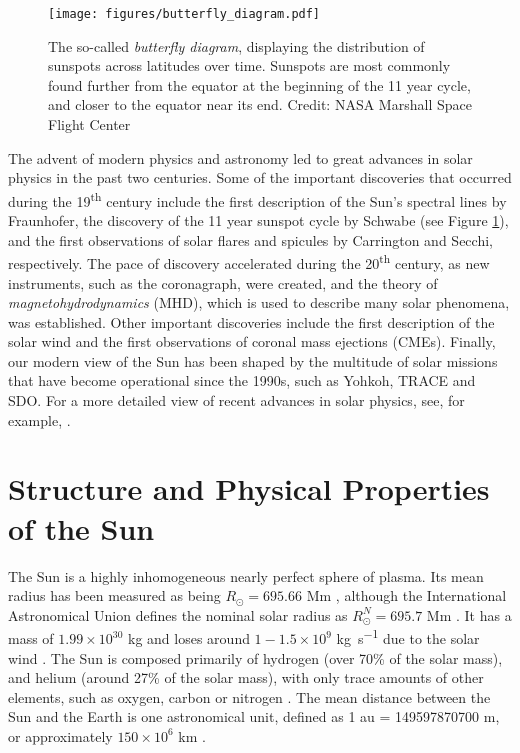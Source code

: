 \begin{figure}[t]
\centering
\texttt{[image: figures/butterfly\_diagram.pdf]}
\caption{The so-called \emph{butterfly diagram}, displaying the distribution of sunspots across latitudes over time.
Sunspots are most commonly found further from the equator at the beginning of the 11 year cycle, and closer to the equator near its end.
Credit: NASA Marshall Space Flight Center
}
\label{fig:butterfly}
\end{figure}

The advent of modern physics and astronomy led to great advances in solar physics in the past two centuries.
Some of the important discoveries that occurred during the 19\textsuperscript{th} century include the first description of the Sun's spectral lines by Fraunhofer, the discovery of the 11 year sunspot cycle by Schwabe (see Figure \ref{fig:butterfly}), and the first observations of solar flares and spicules by Carrington and Secchi, respectively.
The pace of discovery accelerated during the 20\textsuperscript{th} century, as new instruments, such as the coronagraph, were created, and the theory of \emph{magnetohydrodynamics} (MHD), which is used to describe many solar phenomena, was established.
Other important discoveries include the first description of the solar wind \citep{Parker1958} and the first observations of coronal mass ejections (CMEs).
Finally, our modern view of the Sun has been shaped by the multitude of solar missions that have become operational since the 1990s, such as Yohkoh, TRACE and SDO.
For a more detailed view of recent advances in solar physics, see, for example, \cite{Aschwanden2004, Priest2014}.

\section{Structure and Physical Properties of the Sun}
\label{sec:structure}

The Sun is a highly inhomogeneous nearly perfect sphere of plasma.
Its mean radius has been measured as being $R_\odot = 695.66$ \si{Mm} \citep{Haberreiter2008}, although the International Astronomical Union defines the nominal solar radius as $R_\odot^N = 695.7$ \si{Mm} \citep{Mamajek2015}.
It has a mass of $1.99 \times 10^{30}$ \si{kg} and loses around $1-1.5 \times 10^9$ \si{kg.s^{-1}} due to the solar wind \citep{Parker1958, Priest2014}.
The Sun is composed primarily of hydrogen (over 70\% of the solar mass), and helium (around 27\% of the solar mass), with only trace amounts of other elements, such as oxygen, carbon or nitrogen \citep{Lodders2003}.
The mean distance between the Sun and the Earth is one astronomical unit, defined as 1 \si{au} = \num{149597870700} \si{m}, or approximately $150 \times 10^6$ \si{km} \citep{Capitaine2012}.


